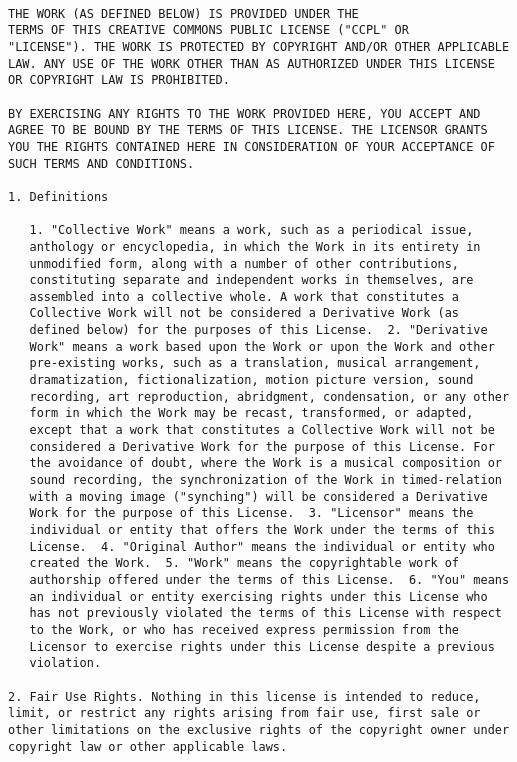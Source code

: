 \begin{lstlisting}[firstnumber=1,]

THE WORK (AS DEFINED BELOW) IS PROVIDED UNDER THE
TERMS OF THIS CREATIVE COMMONS PUBLIC LICENSE ("CCPL" OR
"LICENSE"). THE WORK IS PROTECTED BY COPYRIGHT AND/OR OTHER APPLICABLE
LAW. ANY USE OF THE WORK OTHER THAN AS AUTHORIZED UNDER THIS LICENSE
OR COPYRIGHT LAW IS PROHIBITED.

BY EXERCISING ANY RIGHTS TO THE WORK PROVIDED HERE, YOU ACCEPT AND
AGREE TO BE BOUND BY THE TERMS OF THIS LICENSE. THE LICENSOR GRANTS
YOU THE RIGHTS CONTAINED HERE IN CONSIDERATION OF YOUR ACCEPTANCE OF
SUCH TERMS AND CONDITIONS.

1. Definitions

   1. "Collective Work" means a work, such as a periodical issue,
   anthology or encyclopedia, in which the Work in its entirety in
   unmodified form, along with a number of other contributions,
   constituting separate and independent works in themselves, are
   assembled into a collective whole. A work that constitutes a
   Collective Work will not be considered a Derivative Work (as
   defined below) for the purposes of this License.  2. "Derivative
   Work" means a work based upon the Work or upon the Work and other
   pre-existing works, such as a translation, musical arrangement,
   dramatization, fictionalization, motion picture version, sound
   recording, art reproduction, abridgment, condensation, or any other
   form in which the Work may be recast, transformed, or adapted,
   except that a work that constitutes a Collective Work will not be
   considered a Derivative Work for the purpose of this License. For
   the avoidance of doubt, where the Work is a musical composition or
   sound recording, the synchronization of the Work in timed-relation
   with a moving image ("synching") will be considered a Derivative
   Work for the purpose of this License.  3. "Licensor" means the
   individual or entity that offers the Work under the terms of this
   License.  4. "Original Author" means the individual or entity who
   created the Work.  5. "Work" means the copyrightable work of
   authorship offered under the terms of this License.  6. "You" means
   an individual or entity exercising rights under this License who
   has not previously violated the terms of this License with respect
   to the Work, or who has received express permission from the
   Licensor to exercise rights under this License despite a previous
   violation.

2. Fair Use Rights. Nothing in this license is intended to reduce,
limit, or restrict any rights arising from fair use, first sale or
other limitations on the exclusive rights of the copyright owner under
copyright law or other applicable laws.


\end{lstlisting}
